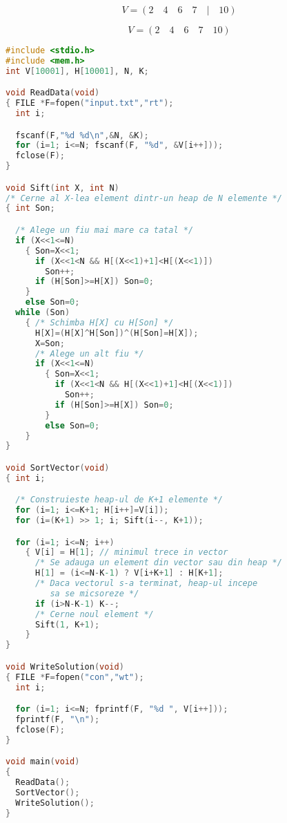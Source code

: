 
\begin{equation*}
  V = (2 \quad 4 \quad 6 \quad 7 \quad | \quad 10)
\end{equation*}


\begin{equation*}
  V = (2 \quad 4 \quad 6 \quad 7 \quad 10)
\end{equation*}

\begin{lstlisting}[language=C]
#include <stdio.h>
#include <mem.h>
int V[10001], H[10001], N, K;

void ReadData(void)
{ FILE *F=fopen("input.txt","rt");
  int i;

  fscanf(F,"%d %d\n",&N, &K);
  for (i=1; i<=N; fscanf(F, "%d", &V[i++]));
  fclose(F);
}

void Sift(int X, int N)
/* Cerne al X-lea element dintr-un heap de N elemente */
{ int Son;

  /* Alege un fiu mai mare ca tatal */
  if (X<<1<=N)
    { Son=X<<1;
      if (X<<1<N && H[(X<<1)+1]<H[(X<<1)])
        Son++;
      if (H[Son]>=H[X]) Son=0;
    }
    else Son=0;
  while (Son)
    { /* Schimba H[X] cu H[Son] */
      H[X]=(H[X]^H[Son])^(H[Son]=H[X]);
      X=Son;
      /* Alege un alt fiu */
      if (X<<1<=N)
        { Son=X<<1;
          if (X<<1<N && H[(X<<1)+1]<H[(X<<1)])
            Son++;
          if (H[Son]>=H[X]) Son=0;
        }
        else Son=0;
    }
}

void SortVector(void)
{ int i;

  /* Construieste heap-ul de K+1 elemente */
  for (i=1; i<=K+1; H[i++]=V[i]);
  for (i=(K+1) >> 1; i; Sift(i--, K+1));

  for (i=1; i<=N; i++)
    { V[i] = H[1]; // minimul trece in vector
      /* Se adauga un element din vector sau din heap */
      H[1] = (i<=N-K-1) ? V[i+K+1] : H[K+1];
      /* Daca vectorul s-a terminat, heap-ul incepe
         sa se micsoreze */
      if (i>N-K-1) K--;
      /* Cerne noul element */
      Sift(1, K+1);
    }
}

void WriteSolution(void)
{ FILE *F=fopen("con","wt");
  int i;

  for (i=1; i<=N; fprintf(F, "%d ", V[i++]));
  fprintf(F, "\n");
  fclose(F);
}

void main(void)
{
  ReadData();
  SortVector();
  WriteSolution();
}
\end{lstlisting}


